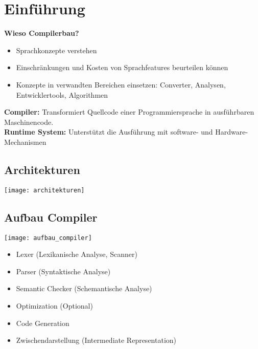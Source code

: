 
\section{Einführung}
\textbf{Wieso Compilerbau?}
\begin{itemize}[topsep=0pt]
    \itemsep -0.4em
    \item Sprachkonzepte verstehen
    \item Einschränkungen und Kosten von Sprachfeatures beurteilen können
    \item Konzepte in verwandten Bereichen einsetzen: Converter, Analysen, Entwicklertools, Algorithmen
\end{itemize}
\textbf{Compiler:} Transformiert Quellcode einer Programmiersprache in ausführbaren Maschinencode.\\
\textbf{Runtime System:} Unterstützt die Ausführung mit software- und Hardware-Mechanismen

\subsection{Architekturen}
\texttt{[image: architekturen]}

\subsection{Aufbau Compiler}
\begin{minipage}{0,3\linewidth}
    \texttt{[image: aufbau\_compiler]}
\end{minipage}
\begin{minipage}{0,7\linewidth}
    \begin{itemize}[topsep=0pt]
        \itemsep -0.2em
        \item Lexer (Lexikanische Analyse, Scanner)
        \item Parser (Syntaktische Analyse)
        \item Semantic Checker (Schemantische Analyse)
        \item Optimization (Optional)
        \item Code Generation
        \item Zwischendarstellung (Intermediate Representation)
    \end{itemize}
\end{minipage}


